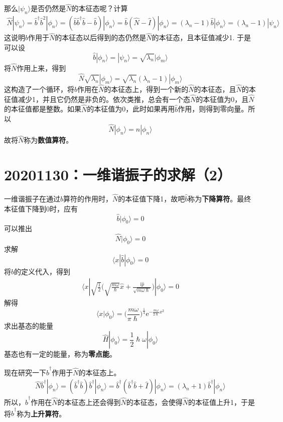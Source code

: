         那么$|\psi_n\rangle$是否仍然是$\hat{N}$的本征态呢？计算
        \begin{equation}\begin{aligned}
            \hat{N}|\psi_n\rangle = \hat{b}^\dagger\hat{b}^2|\phi_n\rangle = (\hat{b}\hat{b}^\dagger\hat{b}- \hat{b})|\phi_n\rangle = \hat{b}(\hat{N}-\hat{I})|\phi_n\rangle = (\lambda_n-1)\hat{b}|\phi_n\rangle = (\lambda_n - 1)|\psi_n\rangle
        \end{aligned}\end{equation}
        这说明$\hat{b}$作用于$\hat{N}$的本征态以后得到的态仍然是$\hat{N}$的本征态，且本征值减少1. 于是可以设
        \[ \hat{b}|\phi_n\rangle = |\psi_n\rangle = \sqrt{\lambda_n}|\phi_m\rangle \]
        将$\hat{N}$作用上来，得到
        \[ \hat{N}\sqrt{\lambda_n}|\phi_m \rangle = \sqrt{\lambda_n}(\lambda_n-1)|\phi_m\rangle \]
        这构造了一个循环，将$\hat{b}$作用在$\hat{N}$的本征态上，得到一个新的$\hat{N}$的本征态，且$\hat{N}$的本征值减少1，并且它仍然是非负的。依次类推，总会有一个态$\hat{N}$的本征值为0，且$\hat{N}$的本征值都是整数。如果$\hat{N}$的本征值为0，此时如果再用$\hat{b}$作用，则得到零向量。所以
        \[ \hat{N}|\phi_n \rangle = n|\phi_n\rangle \]
        故将$\hat{N}$称为\textbf{数值算符}。

    \section{20201130：一维谐振子的求解（2）}
        一维谐振子在通过$\hat{b}$算符的作用时，$\hat{N}$的本征值下降1，故吧$\hat{b}$称为\textbf{下降算符}。最终本征值下降到0时，应有
        \[ \hat{b}|\phi_0 \rangle = 0 \]
        可以推出
        \[ \hat{N}|\phi_0 \rangle = 0 \]
        求解
        \[ \langle x|\hat{b}|\phi_0 \rangle = 0\]
        将$\hat{b}$的定义代入，得到
        \begin{equation}\begin{aligned}
            \langle x|\sqrt{\frac 12}\bigg(\sqrt{\frac {m\omega}{\hslash}}\hat{x}+ \frac {\mathrm{i}\hat{p}}{\sqrt{m\omega\hslash}}\bigg)|\phi_0 \rangle = 0
        \end{aligned}\end{equation}
        解得
        \[ \langle x|\phi_0\rangle = \bigg(\frac {m\omega}{\pi\hslash} \bigg)^{\frac 14} \mathrm{e}^{-\frac {m\omega}{2\hslash}x^2} \]
        求出基态的能量
        \[ \hat{H}|\phi_0 \rangle = \frac 12 \hslash \omega |\phi_0 \rangle \]
        基态也有一定的能量，称为\textbf{零点能}。

        现在研究一下$\hat{b}^\dagger$作用于$\hat{N}$的本征态上。
        \begin{equation}\begin{aligned}
            \hat{N}\hat{b}^\dagger |\phi_n \rangle = (\hat{b}^\dagger \hat{b})\hat{b}^\dagger |\phi_n \rangle = \hat{b}^\dagger (\hat{b}^\dagger\hat{b}+\hat{I})|\phi_n \rangle = (\lambda_n+1) \hat{b}^\dagger |\phi_n \rangle
        \end{aligned}\end{equation}
        所以，$\hat{b}^\dagger$作用在$\hat{N}$的本征态上还会得到$\hat{N}$的本征态，会使得$\hat{N}$的本征值上升1，于是将$\hat{b}^\dagger$称为\textbf{上升算符}。

